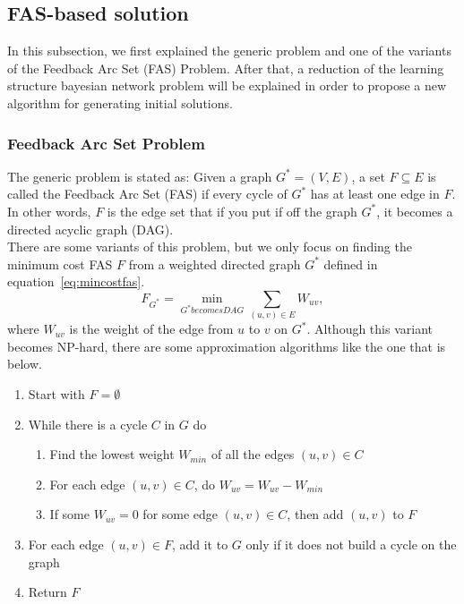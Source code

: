 \subsection{FAS-based solution}
\label{subsec:fasapproach}

In this subsection, we first explained the generic problem and one of the variants of the Feedback Arc Set (FAS) Problem. After that, a reduction of the learning structure bayesian network problem will be explained in order to propose a new algorithm for generating initial solutions.

\subsubsection{Feedback Arc Set Problem}
\label{subsub:fasp}

The generic problem is stated as: Given a graph $G^* = ( V , E )$, a set $F \subseteq E$ is called the Feedback Arc Set (FAS) if every cycle of $G^*$ has at least one edge in $F$. In other words, $F$ is the edge set that if you put if off the graph $G^*$, it becomes a directed acyclic graph (DAG).\\
There are some variants of this problem, but we only focus on finding the minimum cost FAS $F$ from a weighted directed graph $G^*$ defined in equation~\ref{eq:mincostfas}.
\begin{equation}
	\label{eq:mincostfas}
	F_{G^*} = \min_{G^* becomes DAG} \sum_{(u,v) \in E} W_{uv} ,
\end{equation}
where $W_{uv}$ is the weight of the edge from $u$ to $v$ on $G^*$. Although this variant becomes NP-hard, there are some approximation algorithms like the one that is below.
\begin{enumerate}
	\item Start with $F = \emptyset$
	\item While there is a cycle $C$ in $G$ do
	\begin{enumerate}
		\item Find the lowest weight $W_{min}$ of all the edges $(u,v) \in C$
		\item For each edge $(u,v) \in C$, do $W_{uv} = W_{uv} - W_{min}$
		\item If some $W_{uv} = 0$ for some edge $(u,v) \in C$, then add $(u,v)$ to $F$
	\end{enumerate}
	\item For each edge $(u,v) \in F$, add it to $G$ only if it does not build a cycle on the graph
	\item Return $F$
\end{enumerate}

